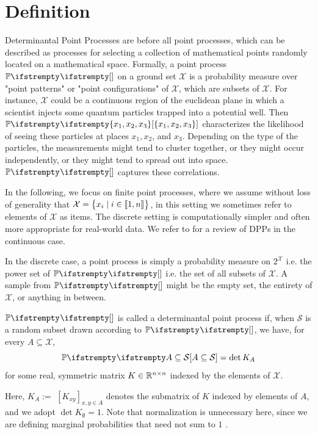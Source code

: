 \section{Definition}
Determinantal Point Processes are before all point processes, which can be described as processes for selecting a collection of mathematical points randomly located on a mathematical space. Formally, a point process $\PP{}{}$ on a ground set $\mathcal{X}$ is a probability measure over "point patterns" or "point configurations" of $\mathcal{X}$, which are subsets of $\mathcal{X}$. For instance, $\mathcal{X}$ could be a continuous region of the euclidean plane in which a scientist injects some quantum particles trapped into a potential well. Then $\PP{}{\left\{x_1, x_2, x_3\right\}}$ characterizes the likelihood of seeing these particles at places $x_1, x_2$, and $x_3$. Depending on the type of the particles, the measurements might tend to cluster together, or they might occur independently, or they might tend to spread out into space. $\PP{}{}$ captures these correlations.

In the following, we focus on finite point processes, where we assume without loss of generality that $\mathcal{X}=\begin{Bmatrix}
    x_{i} \mid i\in \llbracket 1,n \rrbracket
    \end{Bmatrix}$, in this setting we sometimes refer to elements of $\mathcal{X}$ as items. The discrete setting is computationally simpler and often more appropriate for real-world data. We refer to \cite{hough2006_hkpv} for a review of DPPs in the continuous case.

In the discrete case, a point process is simply a probability measure on $2^{\mathcal X}$ i.e. the power set of $\PP{}{}$ i.e. the set of all subsets of $\mathcal{X}$. A sample from $\PP{}{}$ might be the empty set, the entirety of $\mathcal{X}$, or anything in between. 
\begin{tcolorbox}
    \begin{definition}
        \label{def_dpp}
        $\PP{}{}$ is called a determinantal point process if, when $\mathcal{S}$ is a random subset drawn according to $\PP{}{}$, we have, for every $A \subseteq \mathcal{X}$,
        \begin{equation}
            \PP{}{A \subseteq \mathcal{S}}=\operatorname{det}K_A
        \end{equation}
        for some real, symmetric matrix $K \in \mathbb{R}^{n \times n}$ indexed by the elements of $\mathcal{X}$.
    \end{definition}
    Here, $K_A :=$ $\left[K_{x y}\right]_{x, y \in A}$ denotes the submatrix of $K$ indexed by elements of $A$, and we adopt $\operatorname{det}K_\emptyset=1$. Note that normalization is unnecessary here, since we are defining marginal probabilities that need not sum to $1$ .
\end{tcolorbox}

